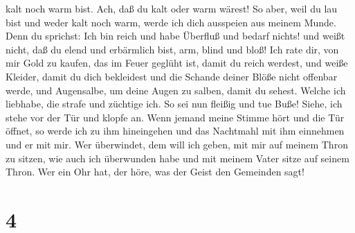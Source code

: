 kalt noch warm bist. Ach, daß du kalt oder warm wärest! 
So aber, weil du lau bist und weder kalt noch warm, werde ich dich
ausspeien aus meinem Munde.  Denn du sprichst: Ich bin
reich und habe Überfluß und bedarf nichts! und weißt nicht, daß du elend
und erbärmlich bist, arm, blind und bloß!  Ich rate dir,
von mir Gold zu kaufen, das im Feuer geglüht ist, damit du reich
werdest, und weiße Kleider, damit du dich bekleidest und die Schande
deiner Blöße nicht offenbar werde, und Augensalbe, um deine Augen zu
salben, damit du sehest.  Welche ich liebhabe, die strafe
und züchtige ich. So sei nun fleißig und tue Buße! 
Siehe, ich stehe vor der Tür und klopfe an. Wenn jemand meine Stimme
hört und die Tür öffnet, so werde ich zu ihm hineingehen und das
Nachtmahl mit ihm einnehmen und er mit mir.  Wer
überwindet, dem will ich geben, mit mir auf meinem Thron zu sitzen, wie
auch ich überwunden habe und mit meinem Vater sitze auf seinem Thron.
 Wer ein Ohr hat, der höre, was der Geist den Gemeinden
sagt!

\hypertarget{section-3}{%
\section{4}\label{section-3}}

